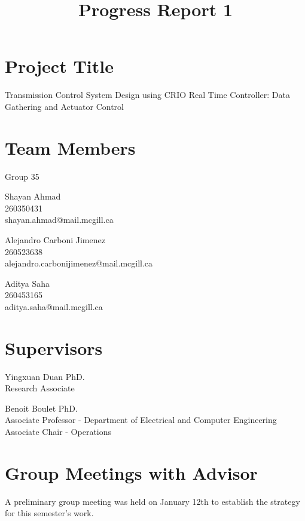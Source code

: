 \documentclass[12pt]{article}
\begin{document}
\title{Progress Report 1}
\date{}
\maketitle
\section*{Project Title} 
Transmission Control System Design using CRIO Real Time Controller:
Data Gathering and Actuator Control
\section*{Team Members}
Group 35 \newline

\hangindent=17.62482pt
Shayan Ahmad \\
260350431 \\
shayan.ahmad@mail.mcgill.ca \newline

\hangindent=17.62482pt
Alejandro Carboni Jimenez \\
260523638 \\
alejandro.carbonijimenez@mail.mcgill.ca \newline

\hangindent=17.62482pt
Aditya Saha \\
260453165 \\
aditya.saha@mail.mcgill.ca

\section*{Supervisors}
\hangindent=17.62482pt
Yingxuan Duan PhD.\\ 
Research Associate\newline 

\hangindent=17.62482pt
Benoit Boulet PhD.\\
Associate Professor - Department of Electrical and Computer Engineering\\
Associate Chair - Operations

\section*{Group Meetings with Advisor}
A preliminary group meeting was held on January 12th to establish the
strategy for this semester's work. \newline
\end{document}
